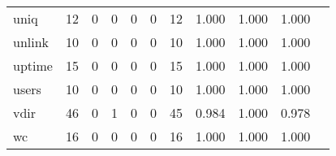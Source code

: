 \begin{longtable}{lp{1.2cm}p{1.2cm}p{1.2cm}p{1.2cm}p{1.2cm}p{1.2cm}p{1.2cm}p{1.2cm}p{1.2cm}p{1.2cm}}
uniq      &                                    12 &                                                  0 &                                                  0 &                                                  0 &                                                  0 &                                                 12 &                                         1.000 &                                              1.000 &                                              1.000 \\
unlink    &                                    10 &                                                  0 &                                                  0 &                                                  0 &                                                  0 &                                                 10 &                                         1.000 &                                              1.000 &                                              1.000 \\
uptime    &                                    15 &                                                  0 &                                                  0 &                                                  0 &                                                  0 &                                                 15 &                                         1.000 &                                              1.000 &                                              1.000 \\
users     &                                    10 &                                                  0 &                                                  0 &                                                  0 &                                                  0 &                                                 10 &                                         1.000 &                                              1.000 &                                              1.000 \\
vdir      &                                    46 &                                                  0 &                                                  1 &                                                  0 &                                                  0 &                                                 45 &                                         0.984 &                                              1.000 &                                              0.978 \\
wc        &                                    16 &                                                  0 &                                                  0 &                                                  0 &                                                  0 &                                                 16 &                                         1.000 &                                              1.000 &                                              1.000 \\

\end{longtable}
